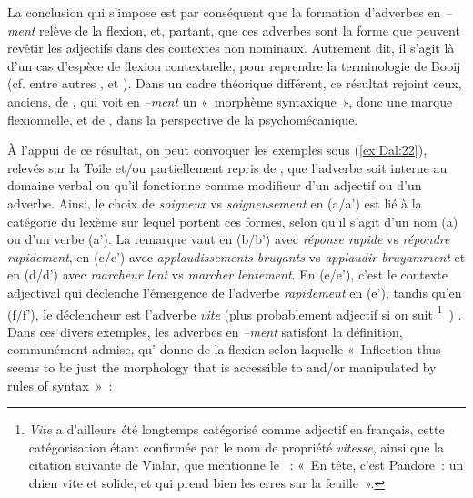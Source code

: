 \documentclass[output=paper]{langsci/langscibook}
\begin{document}
La conclusion qui s'impose est par conséquent que la formation d'adverbes en \emph{--ment} relève de la flexion, et, partant, que ces adverbes sont la forme que peuvent revêtir les adjectifs dans des contextes non nominaux. Autrement dit, il s'agit là d'un cas d'espèce de flexion contextuelle, pour reprendre la terminologie de Booij (cf. entre autres 
\citeyear{Booij94}%
%
, 
\citeyear{Booij96} %
%
 et 
\citeyear{Booij00}%
). Dans un cadre théorique différent, ce résultat rejoint ceux, anciens, de %
\citet[83]{Kurylowicz36}%
%
, qui voit en \emph{--ment} un «~morphème syntaxique~», donc une marque flexionnelle, et de %
\citet{Moignet63}%
%
, dans la perspective de la psychomécanique.

À l'appui de ce résultat, on peut convoquer les exemples sous (\ref{ex:Dal:22}), relevés sur la Toile et/ou partiellement repris de %
\citet{Dal07}%
%
, que l'adverbe soit interne au domaine verbal ou qu'il fonctionne comme modifieur d'un adjectif ou d'un adverbe. Ainsi, le choix de \emph{soigneux} vs \emph{soigneusement} en (a/a') est lié à la catégorie du lexème sur lequel portent ces formes, selon qu'il s'agit d'un nom (a) ou d'un verbe (a'). La remarque vaut en (b/b') avec \emph{réponse rapide} vs \emph{répondre rapidement}, en (c/c') avec \emph{applaudissements bruyants} vs \emph{applaudir bruyamment} et en (d/d') avec \emph{marcheur lent} vs \emph{marcher lentement}. En (e/e'), c'est le contexte adjectival qui déclenche l'émergence de l'adverbe \emph{rapidement} en (e'), tandis qu'en (f/f'), le déclencheur est l'adverbe \emph{vite} %
(plus probablement adjectif si on suit %
\citealt{Giegerich12}%
\footnote{\emph{Vite} a d'ailleurs été longtemps catégorisé comme adjectif en français, cette catégorisation étant confirmée par le nom de propriété \emph{vitesse}, ainsi que la citation suivante de Vialar, que mentionne le \emph{\cite{TLF}}~: «~En tête, c'est Pandore~: un chien vite et solide, et qui prend bien les erres sur la feuille~».}~)
%
. Dans ces divers exemples, les adverbes en \emph{--ment} satisfont la définition, communément admise, qu'%
\citet[83]{Anderson92} %
%
donne de la flexion selon laquelle «~Inflection thus seems to be just the morphology that is accessible to and/or manipulated by rules of syntax~»~:
\end{document}
